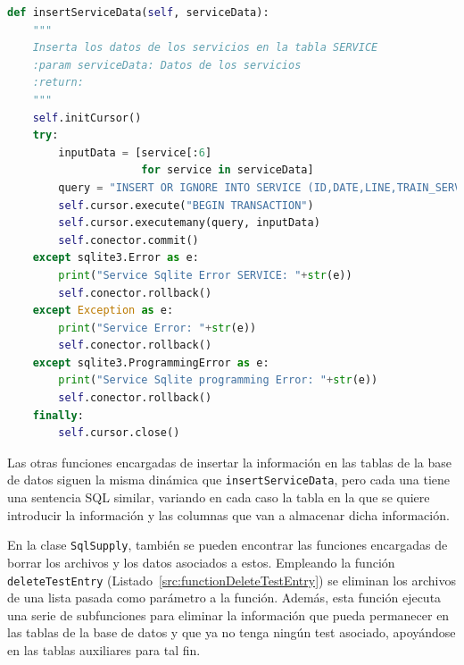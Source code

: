 \begin{lstlisting}[language=Python,
                   style=python,
                   frame=none,
                   numbers=none,
                   basicstyle=\ttfamily\normalsize,
                   caption={Función \texttt{insertServiceData}},
                   label=src:functionInsertServiceData,
                   inputencoding=utf8]                   
def insertServiceData(self, serviceData):
    """
    Inserta los datos de los servicios en la tabla SERVICE
    :param serviceData: Datos de los servicios
    :return:
    """
    self.initCursor()
    try:
        inputData = [service[:6]
                     for service in serviceData]
        query = "INSERT OR IGNORE INTO SERVICE (ID,DATE,LINE,TRAIN_SERVICE_PROVIDER,TIME_SLOT,ROLLING_STOCK) VALUES (?,?,?,?,?,?)"
        self.cursor.execute("BEGIN TRANSACTION")
        self.cursor.executemany(query, inputData)
        self.conector.commit()
    except sqlite3.Error as e:
        print("Service Sqlite Error SERVICE: "+str(e))
        self.conector.rollback()
    except Exception as e:
        print("Service Error: "+str(e))
        self.conector.rollback()
    except sqlite3.ProgrammingError as e:
        print("Service Sqlite programming Error: "+str(e))
        self.conector.rollback()
    finally:
        self.cursor.close()
\end{lstlisting}

Las otras funciones encargadas de insertar la información en las tablas de la base de datos siguen la misma dinámica que \texttt{insertServiceData}, pero cada una tiene una sentencia \acrshort{SQL} similar, variando en cada caso la tabla en la que se quiere introducir la información y las columnas que van a almacenar dicha información.

En la clase \texttt{SqlSupply}, también se pueden encontrar las funciones encargadas de borrar los archivos y los datos asociados a estos. Empleando la función \texttt{deleteTestEntry} (Listado~\ref{src:functionDeleteTestEntry}) se eliminan los archivos de una lista pasada como parámetro a la función. Además, esta función ejecuta una serie de subfunciones para eliminar la información que pueda permanecer en las tablas de la base de datos y que ya no tenga ningún test asociado, apoyándose en las tablas auxiliares para tal fin.

